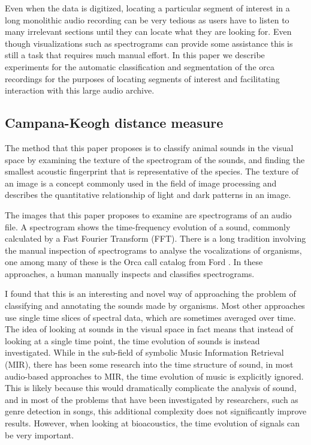 Even when the data is digitized, locating a particular segment of
interest in a long monolithic audio recording can be very tedious as
users have to listen to many irrelevant sections until they can
locate what they are looking for. Even though visualizations such as
spectrograms can provide some assistance this is still a task that requires much
manual effort. In this paper we describe experiments for the automatic
classification and segmentation of the orca recordings for the
purposes of locating segments of interest and facilitating interaction
with this large audio archive.


\subsection{Campana-Keogh distance measure}

The method that this paper proposes is to classify animal sounds in
the visual space by examining the texture of the spectrogram of the
sounds, and finding the smallest acoustic fingerprint that is
representative of the species.  The texture of an image is a concept
commonly used in the field of image processing and describes the
quantitative relationship of light and dark patterns in an image.

The images that this paper proposes to examine are spectrograms of an
audio file.  A spectrogram shows the time-frequency evolution of a
sound, commonly calculated by a Fast Fourier Transform (FFT).  There
is a long tradition involving the manual inspection of spectrograms to
analyse the vocalizations of organisms, one among many of these is the
Orca call catalog from Ford \cite{ford87}.  In these approaches, a
human manually inspects and classifies spectrograms.

I found that this is an interesting and novel way of approaching the
problem of classifying and annotating the sounds made by organisms.
Most other approaches use single time slices of spectral data, which
are sometimes averaged over time.  The idea of looking at sounds in
the visual space in fact means that instead of looking at a single
time point, the time evolution of sounds is instead investigated.
While in the sub-field of symbolic Music Information Retrieval (MIR),
there has been some research into the time structure of sound, in most
audio-based approaches to MIR, the time evolution of music is
explicitly ignored.  This is likely because this would dramatically
complicate the analysis of sound, and in most of the problems that
have been investigated by researchers, such as genre detection in
songs, this additional complexity does not significantly improve
results.  However, when looking at bioacoustics, the time evolution of
signals can be very important.


